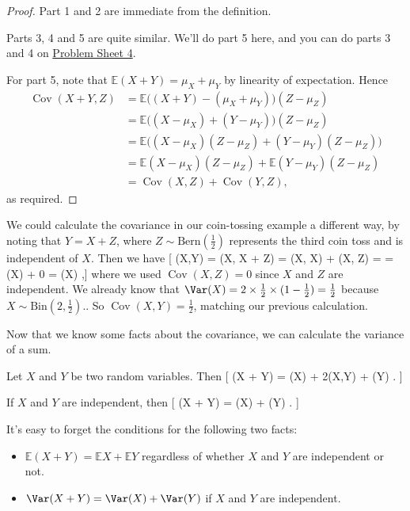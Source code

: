 \documentclass[
  letterpaper,
]{report}
\providecommand{\tightlist}{%
  \setlength{\itemsep}{0pt}\setlength{\parskip}{0pt}}\usepackage{longtable,booktabs,array}
\theoremstyle{definition}
\theoremstyle{definition}
\theoremstyle{remark}
\begin{document}
\begin{proof}

Part 1 and 2 are immediate from the definition.

Parts 3, 4 and 5 are quite similar. We'll do part 5 here, and you can do
parts 3 and 4 on \protect\hyperlink{P4}{Problem Sheet 4}.

For part 5, note that \(\mathbb E(X + Y) = \mu_X + \mu_Y\) by linearity
of expectation. Hence \begin{align*}
\operatorname{Cov}(X + Y, Z)
  &= \mathbb E \big((X + Y) - (\mu_X + \mu_Y)\big)(Z - \mu_Z) \\
  &= \mathbb E \big((X - \mu_X) + (Y - \mu_Y)\big)(Z - \mu_Z) \\
  &= \mathbb E \big((X - \mu_X)(Z - \mu_Z) + (Y - \mu_Y) (Z - \mu_Z) \big) \\
  &= \mathbb E (X - \mu_X)(Z - \mu_Z) + \mathbb E  (Y - \mu_Y) (Z - \mu_Z) \\
  &= \operatorname{Cov}(X,Z) + \operatorname{Cov}(Y,Z) ,
\end{align*} as required.

\end{proof}

We could calculate the covariance in our coin-tossing example a
different way, by noting that \(Y = X + Z\), where
\(Z \sim \text{Bern}(\frac12)\) represents the third coin toss and is
independent of \(X\). Then we have {[} (X,Y) =
(X, X + Z) = (X, X) +
(X, Z) = = \Var(X) + 0 = \Var(X) ,{]} where we used
\(\operatorname{Cov}(X, Z) = 0\) since \(X\) and \(Z\) are independent.
We already know that
\(\Var(X) = 2 \times \tfrac12 \times (1 - \tfrac12) = \tfrac12\) because
\(X \sim \text{Bin}(2, \frac12)\).. So
\(\operatorname{Cov}(X,Y) = \frac12\), matching our previous
calculation.

Now that we know some facts about the covariance, we can calculate the
variance of a sum.

Let \(X\) and \(Y\) be two random variables. Then {[} \Var(X + Y) =
\Var(X) + 2(X,Y) + \Var(Y) . {]}

If \(X\) and \(Y\) are independent, then {[} \Var(X + Y) = \Var(X) +
\Var(Y) . {]}

It's easy to forget the conditions for the following two facts:

\begin{itemize}
\tightlist
\item
  \(\mathbb E(X + Y) = \mathbb EX + \mathbb EY\) regardless of whether
  \(X\) and \(Y\) are independent or not.
\item
  \(\Var(X+Y) = \Var(X) + \Var(Y)\) if \(X\) and \(Y\) are independent.
\end{itemize}
\end{document}
